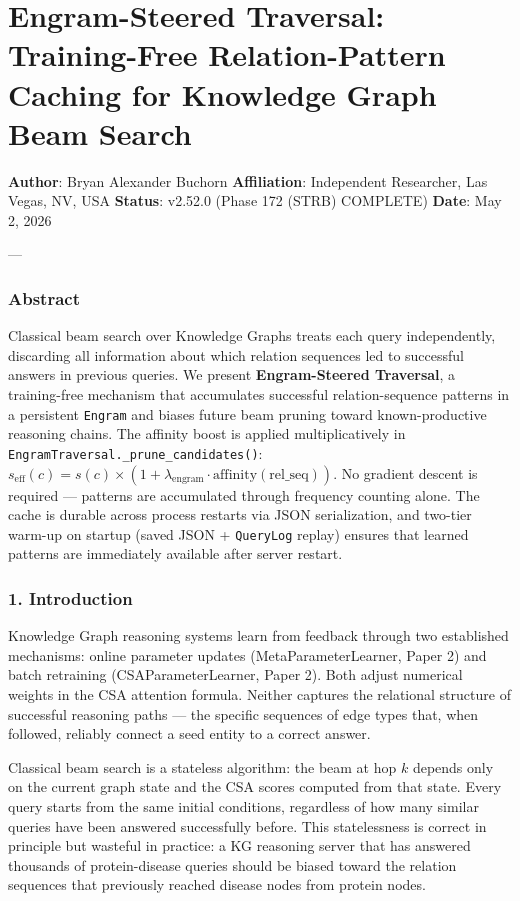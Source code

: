 \section{Engram-Steered Traversal: Training-Free Relation-Pattern Caching for Knowledge Graph Beam Search}

\textbf{Author}: Bryan Alexander Buchorn  
\textbf{Affiliation}: Independent Researcher, Las Vegas, NV, USA  
\textbf{Status}: v2.52.0 (Phase 172 (STRB) COMPLETE)
\textbf{Date}: May 2, 2026

---

\subsubsection{Abstract}
Classical beam search over Knowledge Graphs treats each query indep\-endently, discarding all information about which relation sequences led to successful answers in previous queries. We present \textbf{Engram-Steered Traversal}, a training-free mechanism that accumulates successful relation-sequence patterns in a persistent \texttt{Engram} and biases future beam pruning toward known-productive reasoning chains. The affinity boost is applied multi\-plicatively in \texttt{EngramTraversal.\_prune\_candidates()}: $s_\text{eff}(c) = s(c) \times (1 + \lambda_\text{engram} \cdot \text{affinity}(\text{rel\_seq}))$. No gradient descent is required — patterns are accumulated through frequency counting alone. The cache is durable across process restarts via JSON seria\-lization, and two-tier warm-up on startup (saved JSON + \texttt{QueryLog} replay) ensures that learned patterns are immediately available after server restart.

\subsubsection{1. Introd\-uction}
Knowledge Graph reasoning systems learn from feedback through two established mechanisms: online parameter updates (MetaParameterLearner, Paper 2) and batch retraining (CSAParameterLearner, Paper 2). Both adjust numerical weights in the CSA attention formula. Neither captures the relational structure of successful reasoning paths — the specific sequences of edge types that, when followed, reliably connect a seed entity to a correct answer.

Classical beam search \cite{vaswani2017attention} is a stateless algorithm: the beam at hop $k$ depends only on the current graph state and the CSA scores computed from that state. Every query starts from the same initial conditions, regardless of how many similar queries have been answered succe\-ssfully before. This state\-lessness is correct in principle but wasteful in practice: a KG reasoning server that has answered thousands of protein-disease queries should be biased toward the relation sequences that previously reached disease nodes from protein nodes.

